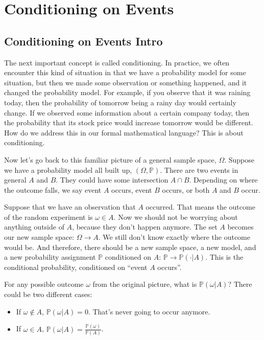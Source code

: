 \documentclass[6008notes.tex]{subfiles}
\begin{document}
\graphicspath{ {images/conditioning/} }

\section{Conditioning on Events}

\subsection{Conditioning on Events Intro}

The next important concept is called conditioning. In practice, we often encounter this kind of situation in that we have a probability model for some situation, but then we made some observation or something happened, and it changed the probability model. For example, if you observe that it was raining today, then the probability of tomorrow being a rainy day would certainly change. If we observed some information about a certain company today, then the probability that its stock price would increase tomorrow would be different. How do we address this in our formal mathematical language? This is about conditioning. 

Now let's go back to this familiar picture of a general sample space, $\Omega$. Suppose we have a probability model all built up, $(\Omega, \mathbb {P})$. There are two events in general $A$ and $B$. They could have some intersection $A \cap B$. Depending on where the outcome falls, we say event $A$ occurs, event $B$ occurs, or both $A$ and $B$ occur.

Suppose that we have an observation that $A$ occurred. That means the outcome of the random experiment is $\omega \in A$. Now we should not be worrying about anything outside of $A$, because they don't happen anymore. The set $A$ becomes our new sample space: $\Omega \longrightarrow A$. We still don't know exactly where the outcome would be. And therefore, there should be a new sample space, a new model, and a new probability assignment $\mathbb{P}$ conditioned on $A$: $\mathbb{P} \longrightarrow \mathbb{P}(\cdot | A)$. This is the conditional probability, conditioned on ``event $A$ occurs''. 

For any possible outcome $\omega$ from the original picture, what is $\mathbb{P}(\omega | A)$? There could be two different cases:

\begin{itemize}
\item If $\omega \notin A$, $\mathbb{P}(\omega | A) = 0$. That's never going to occur anymore.

\item If $\omega \in A$, $\mathbb{P}(\omega | A) = \frac{\mathbb{P}(\omega)}{\mathbb{P}(A)}$.
\end{itemize}
\end{document}
